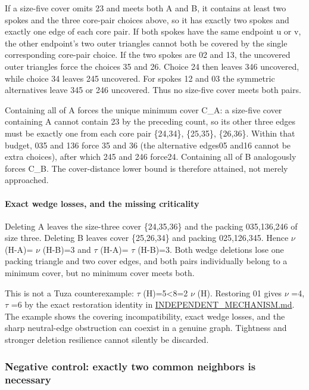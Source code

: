 \documentclass[11pt]{article}
\begin{document}
If a size-five cover omits 23 and meets both A and B, it contains at least two spokes and the three core-pair choices above, so it has exactly two spokes and exactly one edge of each core pair. If both spokes have the same endpoint u or v, the other endpoint's two outer triangles cannot both be covered by the single corresponding core-pair choice. If the two spokes are 02 and 13, the uncovered outer triangles force the choices 35 and 26. Choice 24 then leaves 346 uncovered, while choice 34 leaves 245 uncovered. For spokes 12 and 03 the symmetric alternatives leave 345 or 246 uncovered. Thus no size-five cover meets both pairs.

Containing all of A forces the unique minimum cover C\_A: a size-five cover containing A cannot contain 23 by the preceding count, so its other three edges must be exactly one from each core pair \{24,34\}, \{25,35\}, \{26,36\}. Within that budget, 035 and 136 force 35 and 36 (the alternative edges05 and16 cannot be extra choices), after which 245 and 246 force24. Containing all of B analogously forces C\_B. The cover-distance lower bound is therefore attained, not merely approached.

\paragraph{Exact wedge losses, and the missing criticality}\label{exact-wedge-losses-and-the-missing-criticality}

Deleting A leaves the size-three cover \{24,35,36\} and the packing 035,136,246 of size three. Deleting B leaves cover \{25,26,34\} and packing 025,126,345. Hence \(\nu\) (H-A)= \(\nu\) (H-B)=3 and \(\tau\) (H-A)= \(\tau\) (H-B)=3. Both wedge deletions lose one packing triangle and two cover edges, and both pairs individually belong to a minimum cover, but no minimum cover meets both.

This is not a Tuza counterexample: \(\tau\) (H)=5\textless8=2 \(\nu\) (H). Restoring 01 gives \(\nu\) =4, \(\tau\) =6 by the exact restoration identity in \href{https://github.com/pappa211/ai-math-experiments/blob/main/problems/TUZA-08/notes/INDEPENDENT_MECHANISM.md}{INDEPENDENT\_MECHANISM.md}. The example shows the covering incompatibility, exact wedge losses, and the sharp neutral-edge obstruction can coexist in a genuine graph. Tightness and stronger deletion resilience cannot silently be discarded.

\subsubsection{Negative control: exactly two common neighbors is necessary}\label{negative-control-exactly-two-common-neighbors-is-necessary}
\end{document}
